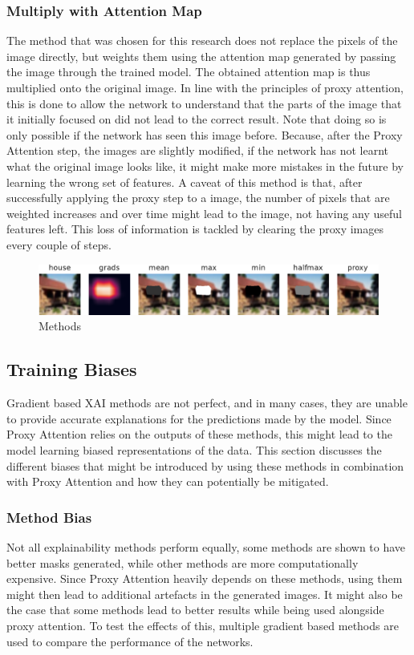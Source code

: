 \subsubsection{Multiply with Attention Map}
The method that was chosen for this research does not replace the pixels of the image directly, but weights them using the attention map generated by passing the image through the trained model. 
The obtained attention map is thus multiplied onto the original image. In line with the principles of proxy attention, this is done to allow the network to understand that the parts of the image that it initially focused on did not lead to the correct result. Note that doing so is only possible if the network has seen this image before. Because, after the Proxy Attention step, the images are slightly modified, if the network has not learnt what the original image looks like, it might make more mistakes in the future by learning the wrong set of features.
A caveat of this method is that, after successfully applying the proxy step to a image, the number of pixels that are weighted increases and over time might lead to the image, not having any useful features left. This loss of information is tackled by clearing the proxy images every couple of steps.

\begin{figure}[h]
    \centering
    \includegraphics[width=1\textwidth]{images/methods.pdf}
	\caption{Methods}
    \label{fig:methods}
\end{figure}

\subsection{Training Biases}
Gradient based XAI methods are not perfect, and in many cases, they are unable to provide accurate explanations for the predictions made by the model. Since Proxy Attention relies on the outputs of these methods, this might lead to the model learning biased representations of the data. This section discusses the different biases that might be introduced by using these methods in combination with Proxy Attention and how they can potentially be mitigated.

\subsubsection{Method Bias}
Not all explainability methods perform equally, some methods are shown to have better masks generated, while other methods are more computationally expensive. Since Proxy Attention heavily depends on these methods, using them might then lead to additional artefacts in the generated images. It might also be the case that some methods lead to better results while being used alongside proxy attention. To test the effects of this, multiple gradient based methods are used to compare the performance of the networks.

